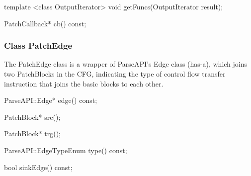 \begin{apient}
template <class OutputIterator>
void getFuncs(OutputIterator result);
\end{apient}


\begin{apient}
PatchCallback* cb() const;
\end{apient}


\subsubsection{Class PatchEdge}
\label{sec:patchedge}


The PatchEdge class is a wrapper of ParseAPI's Edge class (has-a), which joins
two PatchBlocks in the CFG, indicating the type of control flow transfer
instruction that joins the basic blocks to each other.


\begin{apient}
ParseAPI::Edge* edge() const;
\end{apient}


\begin{apient}
PatchBlock* src();
\end{apient}


\begin{apient}
PatchBlock* trg();
\end{apient}


\begin{apient}
ParseAPI::EdgeTypeEnum type() const;
\end{apient}


\begin{apient}
bool sinkEdge() const;
\end{apient}


